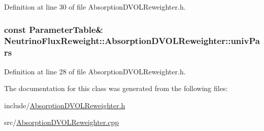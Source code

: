Definition at line 30 of file Absorption\-D\-V\-O\-L\-Reweighter.\-h.

\hypertarget{class_neutrino_flux_reweight_1_1_absorption_d_v_o_l_reweighter_a2bb54a2f64d4cc407e3afa5bf8c298e4}{
\subsubsection[{univ\-Pars}]{\setlength{\rightskip}{0pt plus 5cm}const {\bf Parameter\-Table}\& Neutrino\-Flux\-Reweight\-::\-Absorption\-D\-V\-O\-L\-Reweighter\-::univ\-Pars}}\label{class_neutrino_flux_reweight_1_1_absorption_d_v_o_l_reweighter_a2bb54a2f64d4cc407e3afa5bf8c298e4}


Definition at line 28 of file Absorption\-D\-V\-O\-L\-Reweighter.\-h.



The documentation for this class was generated from the following files\-:\begin{DoxyCompactItemize}
\item 
include/\hyperlink{_absorption_d_v_o_l_reweighter_8h}{Absorption\-D\-V\-O\-L\-Reweighter.\-h}\item 
src/\hyperlink{_absorption_d_v_o_l_reweighter_8cpp}{Absorption\-D\-V\-O\-L\-Reweighter.\-cpp}\end{DoxyCompactItemize}

